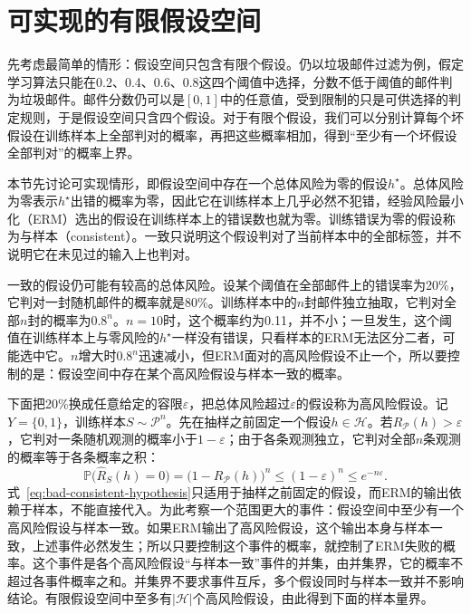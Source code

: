 \section{可实现的有限假设空间}
\label{sec:binary-finite-class}

先考虑最简单的情形：假设空间只包含有限个假设。仍以垃圾邮件过滤为例，假定学习算法只能在0.2、0.4、0.6、0.8这四个阈值中选择，分数不低于阈值的邮件判为垃圾邮件。邮件分数仍可以是$[0,1]$中的任意值，受到限制的只是可供选择的判定规则，于是假设空间只含四个假设。对于有限个假设，我们可以分别计算每个坏假设在训练样本上全部判对的概率，再把这些概率相加，得到“至少有一个坏假设全部判对”的概率上界。

本节先讨论可实现情形，即假设空间中存在一个总体风险为零的假设$h^\star$。总体风险为零表示$h^\star$出错的概率为零，因此它在训练样本上几乎必然不犯错，经验风险最小化（ERM）选出的假设在训练样本上的错误数也就为零。训练错误为零的假设称为与样本（consistent）。一致只说明这个假设判对了当前样本中的全部标签，并不说明它在未见过的输入上也判对。

一致的假设仍可能有较高的总体风险。设某个阈值在全部邮件上的错误率为20\%，它判对一封随机邮件的概率就是80\%。训练样本中的$n$封邮件独立抽取，它判对全部$n$封的概率为$0.8^n$。$n=10$时，这个概率约为0.11，并不小；一旦发生，这个阈值在训练样本上与零风险的$h^\star$一样没有错误，只看样本的ERM无法区分二者，可能选中它。$n$增大时$0.8^n$迅速减小，但ERM面对的高风险假设不止一个，所以要控制的是：假设空间中存在某个高风险假设与样本一致的概率。

下面把20\%换成任意给定的容限$\varepsilon$，把总体风险超过$\varepsilon$的假设称为高风险假设。记$Y=\{0,1\}$，训练样本$S\sim\mathcal P^n$。先在抽样之前固定一个假设$h\in\mathcal H$。若$R_{\mathcal P}(h)>\varepsilon$，它判对一条随机观测的概率小于$1-\varepsilon$；由于各条观测独立，它判对全部$n$条观测的概率等于各条概率之积：
\begin{equation}
  \mathbb P\bigl(\hat R_S(h)=0\bigr)
  =\bigl(1-R_{\mathcal P}(h)\bigr)^n
  \leq(1-\varepsilon)^n\leq e^{-n\varepsilon}.
  \label{eq:bad-consistent-hypothesis}
\end{equation}
式~\eqref{eq:bad-consistent-hypothesis}只适用于抽样之前固定的假设，而ERM的输出依赖于样本，不能直接代入。为此考察一个范围更大的事件：假设空间中至少有一个高风险假设与样本一致。如果ERM输出了高风险假设，这个输出本身与样本一致，上述事件必然发生；所以只要控制这个事件的概率，就控制了ERM失败的概率。这个事件是各个高风险假设“与样本一致”事件的并集，由并集界，它的概率不超过各事件概率之和。并集界不要求事件互斥，多个假设同时与样本一致并不影响结论。有限假设空间中至多有$|\mathcal H|$个高风险假设，由此得到下面的样本量界。

